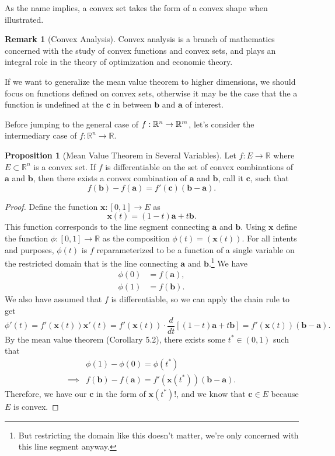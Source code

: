 \documentclass{article}
\newcommand{\R}{\mathbb{R}}
\newcommand{\x}{\mathbf{x}}
\newcommand{\f}{\mathbf{f}}
\renewcommand{\b}{\mathbf{b}}
\renewcommand{\c}{\mathbf{c}}
\renewcommand{\a}{\mathbf{a}}
\theoremstyle{definition}
\newtheorem{proposition}{Proposition}[section]
\newtheorem{remark}{Remark}[section]
\begin{document}
As the name implies, a convex set takes the form of a convex shape when illustrated. 

\begin{remark}[Convex Analysis]
	Convex analysis is a branch of mathematics concerned with the study of convex functions and convex sets, and plays an integral role in the theory of optimization and economic theory. 
\end{remark}

If we want to generalize the mean value theorem to higher dimensions, we should focus on functions defined on convex sets, otherwise it may be the case that the a function is undefined at the $ \mathbf c $ in between $ \mathbf b$ and $ \mathbf a $ of interest. 

Before jumping to the general case of $ \mathbf\f: \R^n\to \R^m $, let's consider the intermediary case of $ f:\R^n\to\R $.
\begin{proposition}[Mean Value Theorem in Several Variables]
	Let $ f:E\to\R $ where $ E\subset\R^n $ is a convex set. If $ f $ is differentiable on the set of convex combinations of $ \mathbf a $ and $ \mathbf b $, then there exists a convex combination of $ \mathbf a $ and $ \mathbf b $, call it $ \mathbf c $, such that 
	$$ f(\mathbf b)-f(\mathbf a)=f'(\mathbf c)(\mathbf b - \mathbf a).$$
\end{proposition}
\begin{proof}
	Define the function $ \x:[0,1]\to E $ as $$\x(t)= (1-t)\a + t\b .$$ This function corresponds to the line segment connecting $ \a $ and $ \b $. Using $ \x $ define the function $ \phi:[0,1]\to\R $ as the composition $ \phi(t)=(\x(t)) $. For all intents and purposes, $ \phi(t) $ is $ f $ reparameterized to be a function of a single variable on the restricted domain that is the line connecting $ \a $ and $ \b $.\footnote{But restricting the domain like this doesn't matter, we're only concerned with this line segment anyway.} We have 
	\begin{align*}
		\phi(0) & = f(\a),\\
		\phi(1) & = f(\b).
	\end{align*}
	We also have assumed that $ f $ is differentiable, so we can apply the chain rule to get 
	$$ \phi'(t) = f'(\x(t))\x'(t) = f'(\x(t))\cdot \frac{d}{dt}[(1-t)\a + t\b] = f'(\x(t))(\b - \a) .$$ 
	By the mean value theorem (Corollary 5.2), there exists some $ t^*\in(0,1) $ such that 
	\begin{align*}
	&\phi(1)- \phi(0) = \phi(t^*)\\
	\implies & f(\b) - f(\a) = f'(\x(t^*))(\b - \a) .
	\end{align*}
	Therefore, we have our $ \c $ in the form of $ \x(t^*) $!, and we know that $ \c \in E $ because $ E $ is convex. 
\end{proof}
\end{document}

